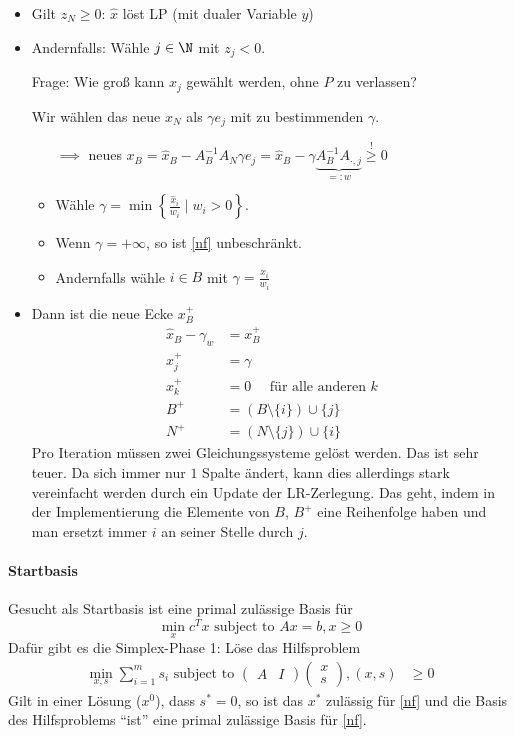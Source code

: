 \begin{itemize}
	\item Gilt $z_{N} \geq 0$: $\hat{x}$ löst LP (mit dualer Variable $y$)
	\item Andernfalls: Wähle $j\in \N$ mit $z_{j}<0$.

		Frage: Wie groß kann $x_{j}$ gewählt werden, ohne $P$ zu verlassen?

		Wir wählen das neue $x_{N}$ als $\gamma e_{j}$ mit zu bestimmenden $\gamma$.
		\begin{itemize}
      \item[$\implies$] neues $x_{B}
        = \hat{x}_{B} - A_{B}^{-1}A_{N}\gamma e_{j}
        = \hat{x}_{B} - \gamma \underbrace{A_{B}^{-1}A_{\cdot,j}}_{=: w}
        \overset{!}{\geq} 0$
			\item Wähle $\gamma = \min \left\{ \frac{\hat{x}_{i}}{w_{i}} \mid w_{i} > 0 \right\}$.
      \item Wenn $\gamma = + \infty$, so ist \eqref{nf} unbeschränkt.
			\item Andernfalls wähle $i \in B$ mit $\gamma = \frac{\hat{x}_{i}}{w_{i}}$
		\end{itemize}
  \item Dann ist die neue Ecke $x_B^+$
		\begin{align*}
			\hat{x}_{B}-\gamma_{w}&= x_{B}^+\\
			x_{j}^+& = \gamma\\
			x_{k}^+ &= 0 \quad \text{ für alle anderen } k\\
			B^+ &= (B \setminus \{i\})\cup \{j\}\\
			N^+ &= (N \setminus \{j\})\cup \{i\}
		\end{align*}
    Pro Iteration müssen zwei Gleichungssysteme gelöst werden. Das ist sehr teuer. Da sich immer nur $1$ Spalte ändert, kann dies allerdings stark vereinfacht werden durch ein Update der LR-Zerlegung. Das geht, indem in der Implementierung die Elemente von $B$, $B^+$ eine Reihenfolge haben und man ersetzt immer $i$ an seiner Stelle durch $j$.
\end{itemize}
\paragraph{Startbasis}
Gesucht als Startbasis ist eine primal zulässige Basis für
\begin{equation*}
	\min_{x} c^Tx \text{ subject to } Ax = b , x \geq 0
\end{equation*}
Dafür gibt es die Simplex-Phase 1: Löse das Hilfsproblem
\begin{align*}
	\min_{x,s} \sum_{i=1}^{m} s_{i} \text{ subject to }
	\begin{pmatrix}
		A& I
	\end{pmatrix}
	\begin{pmatrix}
		x \\ s
	\end{pmatrix}
	, (x,s)& \geq 0
\end{align*}
Gilt in einer Lösung ($x^0$), dass $s^* =0$, so ist das $x^*$ zulässig für \eqref{nf} und die Basis des Hilfsproblems \enquote{ist} eine primal zulässige Basis für \eqref{nf}.

